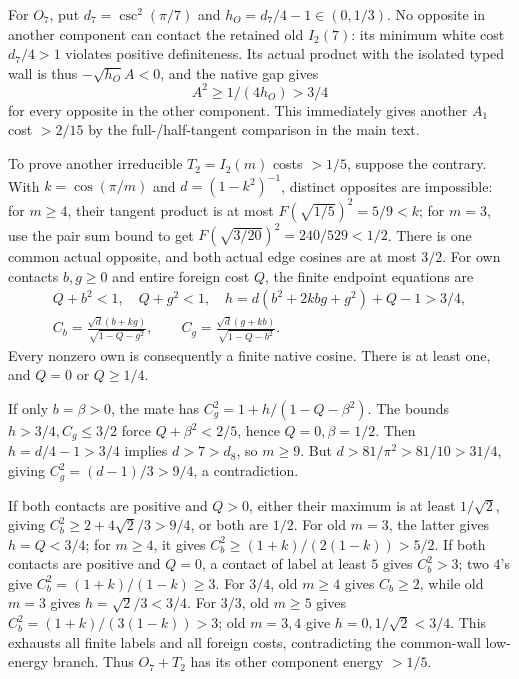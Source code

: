\documentclass[11pt]{article}
\theoremstyle{definition}
\theoremstyle{remark}
\begin{document}
For \(O_7\), put \(d_7=\csc^2(\pi/7)\) and
\(h_O=d_7/4-1\in(0,1/3)\).
No opposite in another component can contact the retained
old \(I_2(7)\): its minimum white cost \(d_7/4>1\) violates
positive definiteness. Its actual product with the isolated
typed wall is thus \(-\sqrt{h_O}A<0\), and the native gap gives
\begin{equation}\label{app:eq:O7height}
 A^2\geq1/(4h_O)>3/4
\end{equation}
for every opposite in the other component.
This immediately gives another \(A_1\) cost \(>2/15\)
by the full-/half-tangent comparison in the main text.

To prove another irreducible \(T_2=I_2(m)\) costs \(>1/5\),
suppose the contrary. With \(k=\cos(\pi/m)\) and
\(d=(1-k^2)^{-1}\), distinct opposites are impossible:
for \(m\geq4\), their tangent product is at most
\(F(\sqrt{1/5})^2=5/9<k\); for \(m=3\), use the pair sum
bound to get \(F(\sqrt{3/20})^2=240/529<1/2\).
There is one common actual opposite, and both actual
edge cosines are at most \(3/2\).
For own contacts \(b,g\geq0\) and entire foreign cost \(Q\),
the finite endpoint equations are
\[
\begin{gathered}
 Q+b^2<1,\quad Q+g^2<1,\quad
 h=d(b^2+2kbg+g^2)+Q-1>3/4,\\
 C_b=\frac{\sqrt d(b+kg)}{\sqrt{1-Q-g^2}},\qquad
 C_g=\frac{\sqrt d(g+kb)}{\sqrt{1-Q-b^2}}.
\end{gathered}
\]
Every nonzero own is consequently a finite native cosine.
There is at least one, and \(Q=0\) or \(Q\geq1/4\).

If only \(b=\beta>0\), the mate has
\(C_g^2=1+h/(1-Q-\beta^2)\).
The bounds \(h>3/4,C_g\leq3/2\) force
\(Q+\beta^2<2/5\), hence \(Q=0,\beta=1/2\).
Then \(h=d/4-1>3/4\) implies \(d>7>d_8\), so \(m\geq9\).
But \(d>81/\pi^2>81/10>31/4\), giving
\(C_g^2=(d-1)/3>9/4\), a contradiction.

If both contacts are positive and \(Q>0\), either their
maximum is at least \(1/\sqrt2\), giving
\(C_b^2\geq2+4\sqrt2/3>9/4\), or both are \(1/2\).
For old \(m=3\), the latter gives \(h=Q<3/4\);
for \(m\geq4\), it gives
\(C_b^2\geq(1+k)/(2(1-k))>5/2\).
If both contacts are positive and \(Q=0\), a contact of
label at least \(5\) gives \(C_b^2>3\); two \(4\)'s give
\(C_b^2=(1+k)/(1-k)\geq3\).
For \(3/4\), old \(m\geq4\) gives \(C_b\geq2\),
while old \(m=3\) gives \(h=\sqrt2/3<3/4\).
For \(3/3\), old \(m\geq5\) gives
\(C_b^2=(1+k)/(3(1-k))>3\);
old \(m=3,4\) give \(h=0,1/\sqrt2<3/4\).
This exhausts all finite labels and all foreign costs,
contradicting the common-wall low-energy branch.
Thus \(O_7+T_2\) has its other component energy \(>1/5\).
\end{document}
